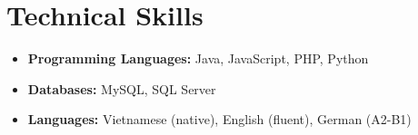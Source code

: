 \documentclass[11pt,a4paper]{article}
\begin{document}
\section{Technical Skills}
\begin{itemize}
  \item \textbf{Programming Languages:} Java, JavaScript, PHP, Python
  \item \textbf{Databases:} MySQL, SQL Server
  \item \textbf{Languages:} Vietnamese (native), English (fluent), German (A2-B1)
\end{itemize}
\end{document}
